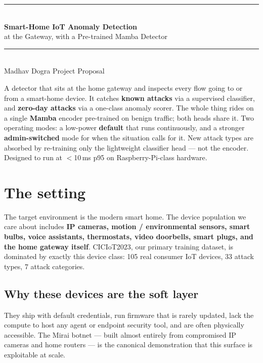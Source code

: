 \documentclass[11pt,a4paper]{article}
\begin{document}
\begin{center}
{\color{primary}\rule{\linewidth}{1pt}}\\[6pt]
{\Huge\bfseries\color{ink} Smart-Home IoT Anomaly Detection} \\[6pt]
{\Large\color{secondary} at the Gateway, with a Pre-trained Mamba Detector} \\[4pt]
{\color{mute}\rule{0.6\linewidth}{0.3pt}}\\[4pt]
{\normalsize\color{mute} Madhav Dogra \quad\textbullet\quad Project Proposal}
\end{center}

\vspace{6pt}

\begin{tcolorbox}[snap]
A detector that sits at the home gateway and inspects every flow going to or from a smart-home device. It catches \textbf{known attacks} via a supervised classifier, and \textbf{zero-day attacks} via a one-class anomaly scorer. The whole thing rides on a single \textbf{Mamba} encoder pre-trained on benign traffic; both heads share it. Two operating modes: a low-power \textbf{default} that runs continuously, and a stronger \textbf{admin-switched} mode for when the situation calls for it. New attack types are absorbed by re-training only the lightweight classifier head --- not the encoder. Designed to run at $<$10\,ms p95 on Raspberry-Pi-class hardware.
\end{tcolorbox}

\section{The setting}

The target environment is the modern smart home. The device population we care about includes \textbf{IP cameras, motion / environmental sensors, smart bulbs, voice assistants, thermostats, video doorbells, smart plugs, and the home gateway itself}. CICIoT2023, our primary training dataset, is dominated by exactly this device class: 105 real consumer IoT devices, 33 attack types, 7 attack categories.

\subsection{Why these devices are the soft layer}
They ship with default credentials, run firmware that is rarely updated, lack the compute to host any agent or endpoint security tool, and are often physically accessible. The Mirai botnet --- built almost entirely from compromised IP cameras and home routers --- is the canonical demonstration that this surface is exploitable at scale.
\end{document}
